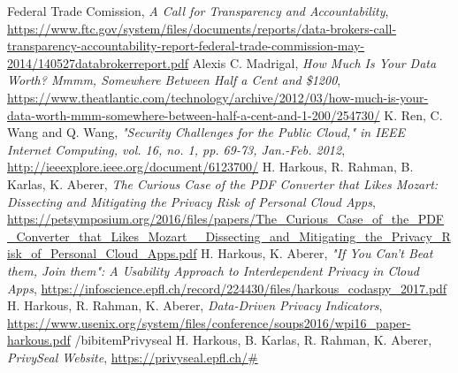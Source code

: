 \documentclass[11pt,twocolumn,a4paper,DIV=calc]{scrartcl}
\begin{document}
\begin{thebibliography}{99}
  Federal Trade Comission, \emph{A Call for Transparency and Accountability}, \url{https://www.ftc.gov/system/files/documents/reports/data-brokers-call-transparency-accountability-report-federal-trade-commission-may-2014/140527databrokerreport.pdf}
  Alexis C. Madrigal, \emph{How Much Is Your Data Worth? Mmmm, Somewhere Between Half a Cent and \$1200}, \url{https://www.theatlantic.com/technology/archive/2012/03/how-much-is-your-data-worth-mmm-somewhere-between-half-a-cent-and-1-200/254730/}
  K. Ren, C. Wang and Q. Wang, \emph{"Security Challenges for the Public Cloud," in IEEE Internet Computing, vol. 16, no. 1, pp. 69-73, Jan.-Feb. 2012}, \url{http://ieeexplore.ieee.org/document/6123700/}
  H. Harkous, R. Rahman, B. Karlas, K. Aberer, \emph{The Curious Case of the PDF Converter that Likes Mozart: Dissecting and Mitigating the Privacy Risk of Personal Cloud Apps}, \url{https://petsymposium.org/2016/files/papers/The\_Curious\_Case\_of\_the\_PDF\_Converter\_that\_Likes\_Mozart\_\_Dissecting\_and\_Mitigating\_the\_Privacy\_Risk\_of\_Personal\_Cloud\_Apps.pdf}
  H. Harkous, K. Aberer, \emph{"If You Can't Beat them, Join them": A Usability Approach to Interdependent Privacy in Cloud Apps}, \url{https://infoscience.epfl.ch/record/224430/files/harkous_codaspy_2017.pdf}
  H. Harkous, R. Rahman, K. Aberer, \emph{Data-Driven Privacy Indicators}, \url{https://www.usenix.org/system/files/conference/soups2016/wpi16_paper-harkous.pdf}
/bibitem{Privyseal}
  H. Harkous, B. Karlas, R. Rahman, K. Aberer, \emph{PrivySeal Website}, \url{https://privyseal.epfl.ch/#}
\end{thebibliography}
\end{document}
